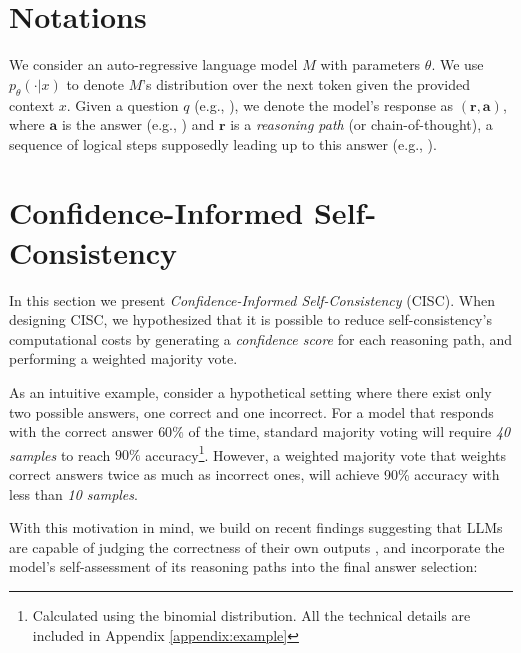 \section{Notations}

We consider an auto-regressive language model $M$ with parameters $\theta$. We use $p_\theta(\cdot \vert x)$ to denote $M$'s distribution over the next token given the provided context $x$. 
Given a question $q$ (e.g., ), we denote the model's response as $(\textbf{r}, \textbf{a})$,
where $\textbf{a}$ is the answer (e.g., ) and $\textbf{r}$ is a \emph{reasoning path} (or chain-of-thought),  a sequence of logical steps supposedly leading up to this answer (e.g., ).

\section{Confidence-Informed Self-Consistency}
\label{sec:cisc}

In this section we present \textit{Confidence-Informed Self-Consistency} (CISC). 
When designing CISC, we hypothesized that it is possible to reduce self-consistency's computational costs by generating a \emph{confidence score} for each reasoning path, and performing a weighted majority vote.

As an intuitive example, consider a hypothetical setting where there exist only two possible answers, one correct and one incorrect. For a model that responds with the correct answer $60\%$ of the time, standard majority voting will require \emph{40 samples} to reach $90\%$ accuracy\footnote{Calculated using the binomial distribution. All the technical details are included in Appendix \ref{appendix:example}}. However, a weighted majority vote that weights correct answers twice as much as incorrect ones, will achieve 90\% accuracy with less than \emph{10 samples}. 

With this motivation in mind, we build on recent findings suggesting that LLMs are capable of judging the correctness of their own outputs \cite{kadavath2022language, tian2023just, zhang2024small}, and incorporate the model’s self-assessment of its reasoning paths into the final answer selection:


